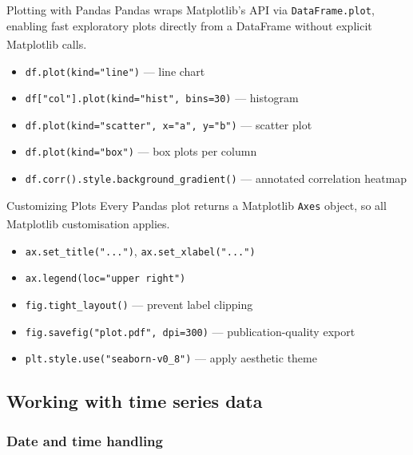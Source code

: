 \begin{v3topic}{Plotting with Pandas}
    Pandas wraps Matplotlib's API via \texttt{DataFrame.plot}, enabling fast exploratory plots directly from a DataFrame without explicit Matplotlib calls\textsuperscript{\cite{molinHandsonDataAnalysis2021}}.
\visualseparator
    \begin{itemize}
        \item \texttt{df.plot(kind="line")} --- line chart
        \item \texttt{df["col"].plot(kind="hist", bins=30)} --- histogram
        \item \texttt{df.plot(kind="scatter", x="a", y="b")} --- scatter plot
        \item \texttt{df.plot(kind="box")} --- box plots per column
        \item \texttt{df.corr().style.background\_gradient()} --- annotated correlation heatmap
    \end{itemize}

\end{v3topic}
\begin{v3topic}{Customizing Plots}
    Every Pandas plot returns a Matplotlib \texttt{Axes} object, so all Matplotlib customisation applies\textsuperscript{\cite{molinHandsonDataAnalysis2021}}.
\visualseparator
    \begin{itemize}
        \item \texttt{ax.set\_title("...")}, \texttt{ax.set\_xlabel("...")}
        \item \texttt{ax.legend(loc="upper right")}
        \item \texttt{fig.tight\_layout()} --- prevent label clipping
        \item \texttt{fig.savefig("plot.pdf", dpi=300)} --- publication-quality export
        \item \texttt{plt.style.use("seaborn-v0\_8")} --- apply aesthetic theme
    \end{itemize}
\end{v3topic}

\subsection{Working with time series data}

\subsubsection{Date and time handling}

